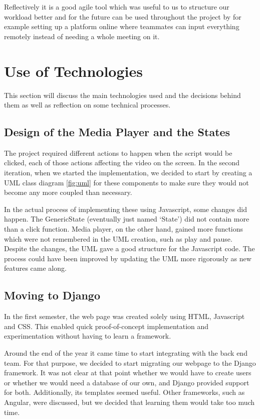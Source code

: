 \documentclass{l3proj}
\begin{document}
Reflectively it is a good agile tool which was useful to us to structure our workload better and for the future can be used throughout the project by for example setting up a platform online where teammates can input everything remotely instead of needing a whole meeting on it.  


\section{Use of Technologies }
\label{development}
This section will discuss the main technologies used and the decisions behind them as well as reflection on some technical processes.

\subsection{Design of the Media Player and the States}

The project required different actions to happen when the script would be clicked, each of those actions affecting the video on the screen. In the second iteration, when we started the implementation, we decided to start by creating a UML class diagram \ref{fig:uml} for these components to make sure they would not become any more coupled than necessary.

In the actual process of implementing these using Javascript, some changes did happen. The GenericState (eventually just named ‘State’) did not contain more than a click function. Media player, on the other hand, gained more functions which were not remembered in the UML creation, such as play and pause. Despite the changes, the UML gave a good structure for the Javascript code. The process could have been improved by updating the UML more rigorously as new features came along.


\subsection{Moving to Django}
In the first semester, the web page was created solely using HTML, Javascript and CSS. This enabled quick proof-of-concept implementation and experimentation without having to learn a framework.

Around the end of the year it came time to start integrating with the back end team. For that purpose, we decided to start migrating our webpage to the Django framework. It was not clear at that point whether we would have to create users or whether we would need a database of our own, and Django provided support for both. Additionally, its templates seemed useful. Other frameworks, such as Angular, were discussed, but we decided that learning them would take too much time.  
\end{document}
